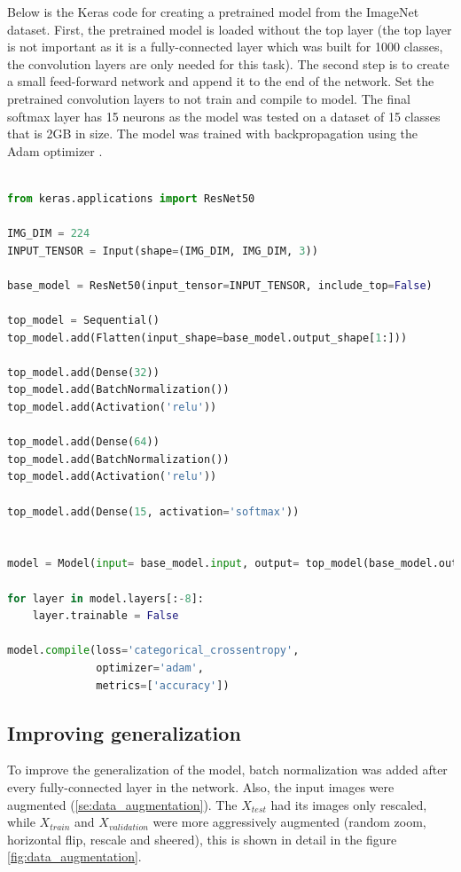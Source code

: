 \documentclass[times, utf8, diplomski]{fer}
\begin{document}
Below is the Keras code for creating a pretrained model from the ImageNet dataset. First, the pretrained model is loaded without the top layer (the top layer is not important as it is a fully-connected layer which was built for 1000 classes, the convolution layers are only needed for this task). The second step is to create a small feed-forward network and append it to the end of the network. Set the pretrained convolution layers to not train and compile to model. The final softmax layer has 15 neurons as the model was tested on a dataset of 15 classes that is 2GB in size. The model was trained with backpropagation using the Adam optimizer \citep{kingma_adam:_2014}.

\begin{lstlisting}[language=Python, caption=Creating a custom pretrained ResNet on the ImageNet dataset]

from keras.applications import ResNet50

IMG_DIM = 224
INPUT_TENSOR = Input(shape=(IMG_DIM, IMG_DIM, 3))

base_model = ResNet50(input_tensor=INPUT_TENSOR, include_top=False)

top_model = Sequential()
top_model.add(Flatten(input_shape=base_model.output_shape[1:]))

top_model.add(Dense(32))
top_model.add(BatchNormalization())
top_model.add(Activation('relu'))

top_model.add(Dense(64))
top_model.add(BatchNormalization())
top_model.add(Activation('relu'))

top_model.add(Dense(15, activation='softmax'))


model = Model(input= base_model.input, output= top_model(base_model.output))

for layer in model.layers[:-8]:
    layer.trainable = False
    
model.compile(loss='categorical_crossentropy',
              optimizer='adam',
              metrics=['accuracy'])
\end{lstlisting}

\subsection{Improving generalization}

To improve the generalization of the model, batch normalization was added after every fully-connected layer in the network. Also, the input images were augmented (\ref{se:data_augmentation}). The $X_{test}$ had its images only rescaled, while $X_{train}$ and $X_{validation}$ were more aggressively augmented (random zoom, horizontal flip, rescale and sheered), this is shown in detail in the figure \ref{fig:data_augmentation}.
\end{document}
